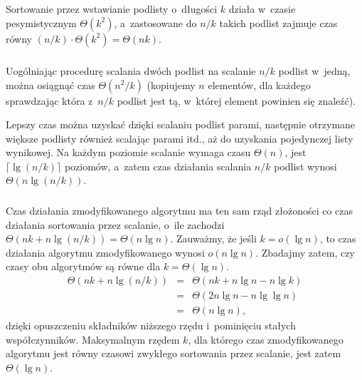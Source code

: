\problems

\subsection{} %

\subsubsection{} %
Sortowanie przez wstawianie podlisty o~długości $k$ działa w~czasie pesymistycznym $\Theta(k^2)$, a~zastosowane do $n/k$ takich podlist zajmuje czas równy $(n/k)\cdot\Theta(k^2) = \Theta(nk)$.

\subsubsection{} %
Uogólniając procedurę scalania dwóch podlist na scalanie $n/k$ podlist w~jedną, można osiągnąć czas $\Theta(n^2/k)$ (kopiujemy $n$ elementów, dla każdego sprawdzając która z~$n/k$ podlist jest tą, w~której element powinien się znaleźć).

Lepszy czas można uzyskać dzięki scalaniu podlist parami, następnie otrzymane większe podlisty również scalając parami itd., aż do uzyskania pojedynczej listy wynikowej. Na każdym poziomie scalanie wymaga czasu $\Theta(n)$, jest $\lceil\lg(n/k)\rceil$ poziomów, a~zatem czas działania scalania $n/k$ podlist wynosi\linebreak$\Theta(n\lg(n/k))$.

\subsubsection{} %
Czas działania zmodyfikowanego algorytmu ma ten sam rząd złożoności co czas działania sortowania przez scalanie, o~ile zachodzi $\Theta(nk+n\lg(n/k))=\Theta(n\lg n)$. Zauważmy, że jeśli $k=o(\lg n)$, to czas działania algorytmu zmodyfikowanego wynosi $o(n\lg n)$. Zbadajmy zatem, czy czasy obu algorytmów są równe dla $k=\Theta(\lg n)$.
\begin{eqnarray*}
	\Theta(nk+n\lg(n/k)) &=& \Theta(nk+n\lg n-n\lg k) \\
	&=& \Theta(2n\lg n-n\lg\lg n) \\
	&=& \Theta(n\lg n),
\end{eqnarray*}
dzięki opuszczeniu składników niższego rzędu i~pominięciu stałych współczynników. Maksymalnym rzędem $k$, dla którego czas zmodyfikowanego algorytmu jest równy czasowi zwykłego sortowania przez scalanie, jest zatem $\Theta(\lg n)$.

